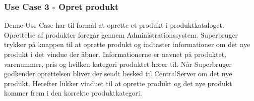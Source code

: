 \subsubsection{Use Case 3 - Opret produkt}
Denne Use Case har til formål at oprette et produkt i produktkataloget. Oprettelse af produkter foregår gennem Administrationssystem. Superbruger trykker på knappen til at oprette produkt og indtaster informationer om det nye produkt i det vindue der åbner. Informationerne er navnet på produktet, varenummer, pris og hvilken kategori produktet hører til. Når Superbruger godkender oprettelsen bliver der sendt besked til CentralServer om det nye produkt. Herefter lukker vinduet til at oprette produkt og det nye produkt kommer frem i den korrekte produktkategori.